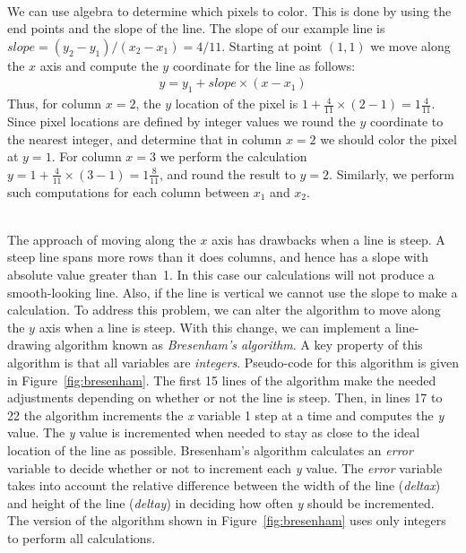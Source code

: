 \documentclass[epsfig,10pt,fullpage]{article}
\begin{document}
~\\
\noindent
We can use algebra to determine which pixels to color. This is done by using the end points and 
the slope of the line. The slope of our example line is $slope = (y_2 - y_1)/(x_2 - x_1) = 4/11$. 
Starting at point $(1,1)$ we move along the $x$ axis and compute the $y$ coordinate for the 
line as follows:
\begin{eqnarray*}
y = y_1 + slope \times (x - x_1)
\end{eqnarray*}
\noindent
Thus, for column $x = 2$, the $y$ location of the pixel is
$1 + \frac{4}{11} \times (2-1) = 1 \frac{4}{11}$. 
Since pixel locations are defined by integer values we round the $y$ coordinate to the nearest 
integer, and determine that in column $x = 2$ we should color the pixel at $y = 1$. For
column $x = 3$ we perform the calculation $y = 1 + \frac{4}{11} \times (3-1) = 1
\frac{8}{11}$, and round the result to $y = 2$.  Similarly, we perform such computations 
for each column between $x_1$ and $x_2$.

~\\
\noindent
The approach of moving along the $x$ axis has drawbacks when a line is steep. A steep line
spans more rows than it does columns, and hence has a slope with absolute value greater than~1.
In this case our calculations will not produce a smooth-looking line.  Also, if the line
is vertical we cannot use the slope to make a calculation.  To address this 
problem, we can alter the algorithm to move along the $y$ axis when a line is steep. With 
this change, we can implement a line-drawing algorithm known as {\it Bresenham's algorithm}.
A key property of this algorithm is that all variables are {\it integers}.
Pseudo-code for this algorithm is given in Figure~\ref{fig:bresenham}. The first 15
lines of the algorithm make the needed adjustments depending on whether or not the line is
steep. Then, in lines 17 to 22 the algorithm increments the {\it x} variable 1 step at a time
and computes the {\it y} value. The {\it y} value is incremented when needed to stay as
close to the ideal location of the line as possible. Bresenham's algorithm calculates an
{\it error} variable to decide whether or not to increment each {\it y} value. 
The {\it error} variable takes into account the relative difference
between the width of the line ({\it deltax}) and height of the line ({\it deltay}) in deciding
how often {\it y} should be incremented.  The version
of the algorithm shown in Figure~\ref{fig:bresenham} uses only integers to perform
all calculations.
\end{document}
